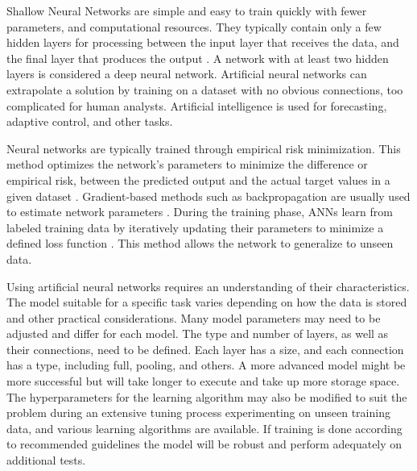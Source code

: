 \documentclass[preprint,12pt]{elsarticle}
\begin{document}
Shallow Neural Networks are simple and easy to train quickly with fewer parameters, and computational resources. They typically contain only a few hidden layers for processing between the input layer that receives the data, and the final layer that produces the output \cite{olden2002illuminating, ozesmi1999artificial}.  A network with at least two hidden layers \cite{bishop2006pattern} is considered a deep neural network. Artificial neural networks can extrapolate a solution by training on a dataset with no obvious connections, too complicated for human analysts. Artificial intelligence is used for forecasting, adaptive control, and other tasks.

Neural networks are typically trained through empirical risk minimization. This method optimizes the network's parameters to minimize the difference or empirical risk, between the predicted output and the actual target values in a given dataset \cite{vapnik2013nature}. Gradient-based methods such as backpropagation are usually used to estimate network parameters  \cite{vapnik2013nature}. During the training phase, ANNs learn from labeled training data by iteratively updating their parameters to minimize a defined loss function \cite{goodfellow2016deep}. This method allows the network to generalize to unseen data.

Using artificial neural networks requires an understanding of their characteristics. The model suitable for a specific task varies depending on how the data is stored and other practical considerations. Many model parameters may need to be adjusted and differ for each model. The type and number of layers, as well as their connections, need to be defined. Each layer has a size, and each connection has a type, including full, pooling, and others. A more advanced model might be more successful but will take longer to execute and take up more storage space. The hyperparameters for the learning algorithm may also be modified to suit the problem \cite{probst2019tunability} during an extensive tuning process experimenting on unseen training data, and various learning algorithms are available. If training is done according to recommended guidelines the model will be robust and perform adequately on additional tests.
\end{document}
